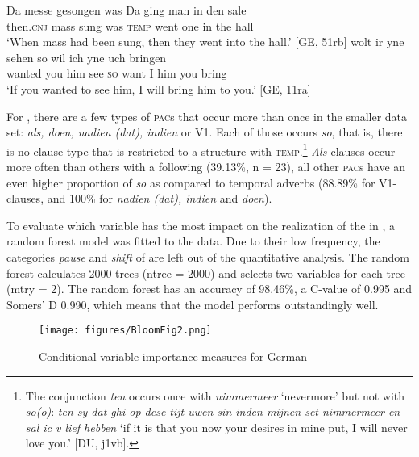 \documentclass[output=paper,colorlinks,citecolor=brown]{langscibook}
\begin{document}
\ea
\ea \label{ex:da1}
\gll Da messe gesongen was Da ging man in den sale\\
then.\textsc{cnj} mass sung was \textsc{temp} went one in the hall\\
\glt `When mass had been sung, then they went into the hall.' \hfill [GE, 51rb]
\ex \label{ex:so}
\gll wolt ir yne sehen so wil ich yne uch bringen\\
wanted you him see \textsc{so} want I him you bring \\
\glt `If you wanted to see him, I will bring him to you.' \hfill [GE, 11ra]
\z
\z

For , there are a few types of \textsc{pac}s that occur more than once in the smaller data set: \textit{als, doen, nadien (dat), indien} or V1. Each of those occurs \textit{so}, that is, there is no clause type that is restricted to a  structure with \textsc{temp}.\footnote{The conjunction \textit{ten} occurs once with \textit{nimmermeer} `nevermore' but not with \textit{so(o)}: \textit{ten sy dat ghi op dese tijt uwen sin inden mijnen set nimmermeer en sal ic v lief hebben} `if it is that you now your desires in mine put, I will never love you.' [DU, j1vb].} \textit{Als-}clauses occur more often than others with a following  (39.13\%, n = 23), all other \textsc{pac}s have an even higher proportion of \textit{so} as compared to temporal adverbs (88.89\% for V1-clauses, and 100\% for \textit{nadien (dat), indien} and \textit{doen}).

To evaluate which variable has the most impact on the realization of the  in , a random forest model was fitted to the data. Due to their low frequency, the categories \textit{pause} and \textit{shift} of  are left out of the quantitative analysis. The random forest calculates 2000 trees (ntree = 2000) and selects two variables for each tree (mtry = 2). The random forest has an accuracy of 98.46\%, a C-value of 0.995 and Somers' D 0.990, which means that the model performs outstandingly well.

\begin{figure}
\caption{Conditional variable importance measures for German}\label{fig:1}
	\texttt{[image: figures/BloomFig2.png]}
\end{figure}
\end{document}
